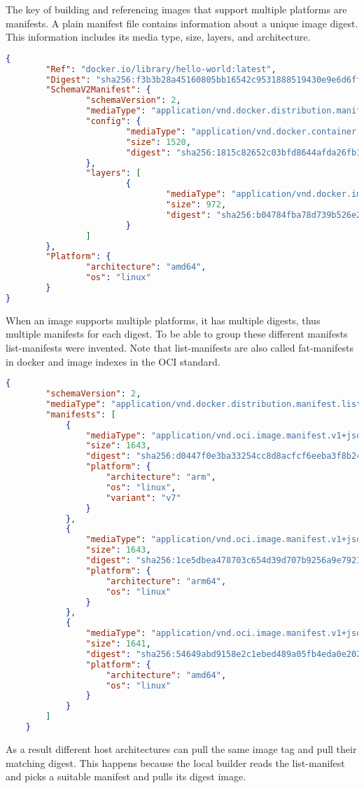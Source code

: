 The key of building and referencing images that support multiple platforms are manifests.
A plain manifest file contains information about a unique image digest.
This information includes its media type, size, layers, and architecture.
\begin{lstlisting}[language=json]
    {
        "Ref": "docker.io/library/hello-world:latest",
        "Digest": "sha256:f3b3b28a45160805bb16542c9531888519430e9e6d6ffc09d72261b0d26ff74f",
        "SchemaV2Manifest": {
                "schemaVersion": 2,
                "mediaType": "application/vnd.docker.distribution.manifest.v2+json",
                "config": {
                        "mediaType": "application/vnd.docker.container.image.v1+json",
                        "size": 1520,
                        "digest": "sha256:1815c82652c03bfd8644afda26fb184f2ed891d921b20a0703b46768f9755c57"
                },
                "layers": [
                        {
                                "mediaType": "application/vnd.docker.image.rootfs.diff.tar.gzip",
                                "size": 972,
                                "digest": "sha256:b04784fba78d739b526e27edc02a5a8cd07b1052e9283f5fc155828f4b614c28"
                        }
                ]
        },
        "Platform": {
                "architecture": "amd64",
                "os": "linux"
        }
}
\end{lstlisting}
When an image supports multiple platforms, it has multiple digests, thus multiple manifests for each digest.
To be able to group these different manifests list-manifests were invented.
Note that list-manifests are also called fat-manifests in docker and image indexes in the OCI standard.
\begin{lstlisting}[language=json]
    {
        "schemaVersion": 2,
        "mediaType": "application/vnd.docker.distribution.manifest.list.v2+json",
        "manifests": [
            {
                "mediaType": "application/vnd.oci.image.manifest.v1+json",
                "size": 1643,
                "digest": "sha256:d0447f0e3ba33254cc8d8acfcf6eeba3f8b245fa43bd0de9be1438dd0fd37fb1",
                "platform": {
                    "architecture": "arm",
                    "os": "linux",
                    "variant": "v7"
                }
            },
            {
                "mediaType": "application/vnd.oci.image.manifest.v1+json",
                "size": 1643,
                "digest": "sha256:1ce5dbea478703c654d39d707b9256a9e7921bf0e0bc2fb393254f1ca9b8d947",
                "platform": {
                    "architecture": "arm64",
                    "os": "linux"
                }
            },
            {
                "mediaType": "application/vnd.oci.image.manifest.v1+json",
                "size": 1641,
                "digest": "sha256:54649abd9158e2c1ebed489a05fb4eda0e2026abefca2def7ce5713cfbff60ea",
                "platform": {
                    "architecture": "amd64",
                    "os": "linux"
                }
            }
        ]
    }
\end{lstlisting}
As a result different host architectures can pull the same image tag and pull their matching digest.
This happens because the local builder reads the list-manifest and picks a suitable manifest and pulls its digest image.

